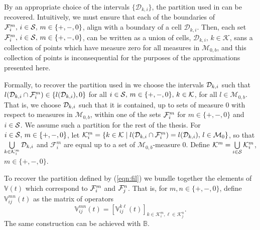 By an appropriate choice of the intervals \(\{\mathcal D_{k,i}\}\), the partition used in \cite{bo2014} can be recovered. Intuitively, we must ensure that each of the boundaries of \(\mathcal{F}_i^m,\, i\in\mathcal{S},\,m\in\{+,-,0\}\), align with a boundary of a cell \(\mathcal D_{k,i}\). Then, each set \(\mathcal{F}_i^m,\, i\in\mathcal{S},\,m\in\{+,-,0\}\), can be written as a union of cells, \(\mathcal D_{k,i},\,k\in\mathcal K\), sans a collection of points which have measure zero for all measures in \(\mathcal M_{0,b}\), and this collection of points is inconsequential for the purposes of the approximations presented here. 

Formally, to recover the partition used in \citep{bo2014} we choose the intervals \(\mathcal{D}_{k,i}\) such that \(   l (\mathcal{D}_{k,i}\cap\mathcal{F}_i^m) \in \{   l (\mathcal{D}_{k,i}), 0\}\) for all \(i\in\mathcal{S},\,m\in\{+,-,0\},\,k\in\mathcal K\), for all \( l \in\mathcal M_{0,b}\). That is, we choose \(\mathcal{D}_{k,i}\) such that it is contained, up to sets of measure 0 with respect to measures in \(\mathcal M_{0,b}\), within one of the sets \(\mathcal{F}_i^m\) for \(m\in\{+,-,0\}\) and \(i\in\mathcal{S}\). We assume such a partition for the rest of the thesis. For \(i\in\mathcal{S},\,m\in\{+,-,0\}\), let \(\mathcal K^m_i = \{k\in\mathcal K\mid  l (\mathcal{D}_{k,i}\cap\mathcal{F}_i^m) =   l (\mathcal{D}_{k,i}),\,l\in\mathcal M_0 \}\), so that \(\bigcup\limits_{k\in\mathcal K_i^m} \mathcal{D}_{k,i}\) and \(\mathcal F_i^m\) are equal up to a set of \(\mathcal M_{0,b}\)-measure 0. Define \(\mathcal K^m = \bigcup\limits_{i\in\mathcal{S}}\mathcal K_i^m\), \(m\in\{+,-,0\}\). 

To recover the partition defined by (\ref{eqn:fil}) we bundle together the elements of \(\mathbb V(t)\) which correspond to \(\mathcal{F}_i^m\) and \(\mathcal{F}_j^n\). That is, for \(m,n\in\{+,-,0\}\), define \(\mathbb V_{ij}^{m n}(t)\) as the matrix of operators 
\[\mathbb V_{ij}^{m n}(t) = \left[\mathbb V_{ij}^{k \ell}(t)\right]_{k\in\mathcal K_i^m,\ell\in\mathcal K_j^n}.\] 
The same construction can be achieved with \(\mathbb B\). 

